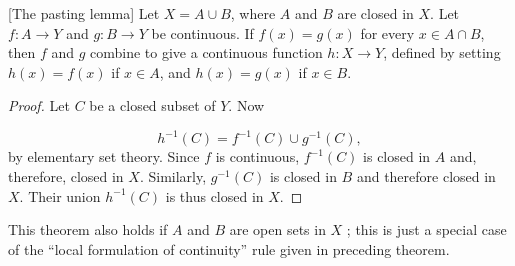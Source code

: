 \begin{theorem}
\label{thm:\thetheorem}[The pasting lemma]
 Let \(X = A \cup B\), where \(A\) and \(B\) are closed in \(X\). Let \(f : A \rightarrow Y\) and \(g : B \rightarrow Y\) be continuous. If \(f(x) = g(x)\) for every \(x \in A \cap B\), then \(f\) and \(g\) combine to give a continuous function \(h : X \rightarrow Y\), defined by setting \(h(x) = f(x)\) if \(x \in A\), and \(h(x) = g(x)\) if \(x \in B\).
\end{theorem}

\begin{proof}
 Let \(C\) be a closed subset of \(Y\). Now

 \[
 h^{-1}( C) = f^{-1}( C) \cup {g}^{-1}( C),
 \]
 by elementary set theory. Since \(f\) is continuous, \(f^{-1}( C)\) is closed in \(A\) and, therefore, closed in \(X\). Similarly, \(g^{-1}( C)\) is closed in \(B\) and therefore closed in \(X\). Their union \(h^{-1}( C)\) is thus closed in \(X\).
\end{proof}

This theorem also holds if \(A\) and \(B\) are open sets in \(X\) ; this is just a special case of the ``local formulation of continuity'' rule given in preceding theorem.

